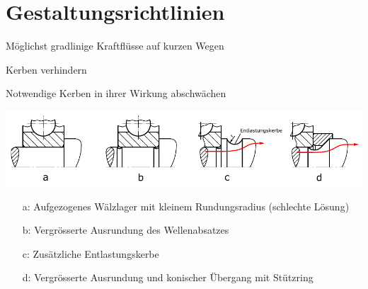 \section{Gestaltungsrichtlinien} %
	\begin{tightitemize}
		\item Möglichst gradlinige Kraftflüsse auf kurzen Wegen
		\item Kerben verhindern
		\item Notwendige Kerben in ihrer Wirkung abschwächen
	\end{tightitemize}
	
	\includegraphics[width=\columnwidth]{graphics/kerben}
	\begin{itemize}
		\item[a:] Aufgezogenes Wälzlager mit kleinem Rundungsradius (schlechte Lösung)
		\item[b:] Vergrösserte Ausrundung des Wellenabsatzes
		\item[c:] Zusätzliche Entlastungskerbe
		\item[d:] Vergrösserte Ausrundung und konischer Übergang mit Stützring
	\end{itemize}
